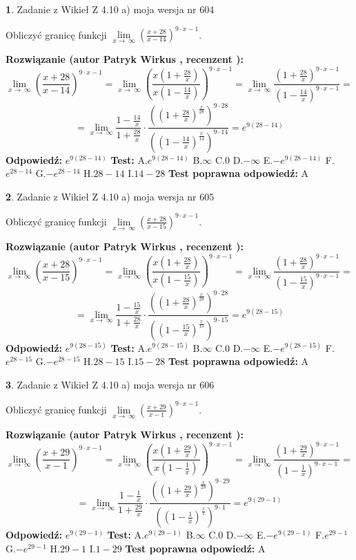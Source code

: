 \documentclass[12pt, a4paper]{article}
\theoremstyle{definition} %
\newtheorem{zad}{}
\newcommand{\zadStart}[1]{\begin{zad}#1\newline}
\newcommand{\zadStop}{\end{zad}}
\newcommand{\rozwStart}[2]{\noindent \textbf{Rozwiązanie (autor #1 , recenzent #2): }\newline}
\newcommand{\rozwStop}{\newline}
\newcommand{\odpStart}{\noindent \textbf{Odpowiedź:}\newline}
\newcommand{\odpStop}{\newline}
\newcommand{\testStart}{\noindent \textbf{Test:}\newline}
\newcommand{\testStop}{\newline}
\newcommand{\kluczStart}{\noindent \textbf{Test poprawna odpowiedź:}\newline}
\newcommand{\kluczStop}{\newline}
\begin{document}
\zadStart{Zadanie z Wikieł Z 4.10 a) moja wersja nr 604}


Obliczyć granicę funkcji  $\lim\limits_{x\to\ \infty}(\frac{x+28}{x-14})^{9\cdot x-1}$.
\zadStop
\rozwStart{Patryk Wirkus}{}
$$\lim\limits_{x\to\ \infty}(\frac{x+28}{x-14})^{9\cdot x-1} = \lim\limits_{x\to\ \infty}(\frac{x(1+\frac{28}{x})}{x(1-\frac{14}{x})})^{9\cdot x-1}=\lim\limits_{x\to\ \infty}\frac{(1+\frac{28}{x})^{9\cdot x-1}}{(1-\frac{14}{x})^{9\cdot x-1}}=$$
$$=\lim\limits_{x\to\ \infty}\frac{1-\frac{14}{x}}{1+\frac{28}{x}}\cdot\frac{((1+\frac{28}{x})^{\frac{x}{28}})^{9\cdot28}}{((1-\frac{14}{x})^{\frac{x}{14}})^{9\cdot14}}=e^{9(28-14)}$$
\rozwStop
\odpStart
$e^{9(28-14)}$
\odpStop
\testStart
A.$e^{9(28-14)}$ B.$\infty$ C.$0$ D.$-\infty$ E.$-e^{9(28-14)}$
F.$e^{28-14}$ G.$-e^{28-14}$
H.$28-14$
I.$14-28$
\testStop
\kluczStart
A
\kluczStop



\zadStart{Zadanie z Wikieł Z 4.10 a) moja wersja nr 605}


Obliczyć granicę funkcji  $\lim\limits_{x\to\ \infty}(\frac{x+28}{x-15})^{9\cdot x-1}$.
\zadStop
\rozwStart{Patryk Wirkus}{}
$$\lim\limits_{x\to\ \infty}(\frac{x+28}{x-15})^{9\cdot x-1} = \lim\limits_{x\to\ \infty}(\frac{x(1+\frac{28}{x})}{x(1-\frac{15}{x})})^{9\cdot x-1}=\lim\limits_{x\to\ \infty}\frac{(1+\frac{28}{x})^{9\cdot x-1}}{(1-\frac{15}{x})^{9\cdot x-1}}=$$
$$=\lim\limits_{x\to\ \infty}\frac{1-\frac{15}{x}}{1+\frac{28}{x}}\cdot\frac{((1+\frac{28}{x})^{\frac{x}{28}})^{9\cdot28}}{((1-\frac{15}{x})^{\frac{x}{15}})^{9\cdot15}}=e^{9(28-15)}$$
\rozwStop
\odpStart
$e^{9(28-15)}$
\odpStop
\testStart
A.$e^{9(28-15)}$ B.$\infty$ C.$0$ D.$-\infty$ E.$-e^{9(28-15)}$
F.$e^{28-15}$ G.$-e^{28-15}$
H.$28-15$
I.$15-28$
\testStop
\kluczStart
A
\kluczStop



\zadStart{Zadanie z Wikieł Z 4.10 a) moja wersja nr 606}


Obliczyć granicę funkcji  $\lim\limits_{x\to\ \infty}(\frac{x+29}{x-1})^{9\cdot x-1}$.
\zadStop
\rozwStart{Patryk Wirkus}{}
$$\lim\limits_{x\to\ \infty}(\frac{x+29}{x-1})^{9\cdot x-1} = \lim\limits_{x\to\ \infty}(\frac{x(1+\frac{29}{x})}{x(1-\frac{1}{x})})^{9\cdot x-1}=\lim\limits_{x\to\ \infty}\frac{(1+\frac{29}{x})^{9\cdot x-1}}{(1-\frac{1}{x})^{9\cdot x-1}}=$$
$$=\lim\limits_{x\to\ \infty}\frac{1-\frac{1}{x}}{1+\frac{29}{x}}\cdot\frac{((1+\frac{29}{x})^{\frac{x}{29}})^{9\cdot29}}{((1-\frac{1}{x})^{\frac{x}{1}})^{9\cdot1}}=e^{9(29-1)}$$
\rozwStop
\odpStart
$e^{9(29-1)}$
\odpStop
\testStart
A.$e^{9(29-1)}$ B.$\infty$ C.$0$ D.$-\infty$ E.$-e^{9(29-1)}$
F.$e^{29-1}$ G.$-e^{29-1}$
H.$29-1$
I.$1-29$
\testStop
\kluczStart
A
\kluczStop
\end{document}
